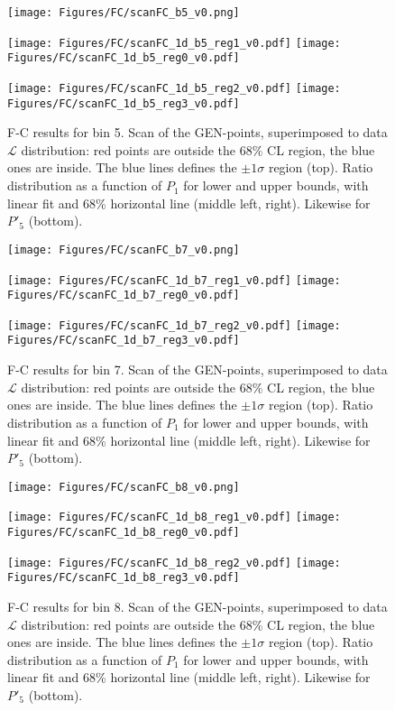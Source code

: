 \begin{figure}
  \centering
  \texttt{[image: Figures/FC/scanFC\_b5\_v0.png]}

  \texttt{[image: Figures/FC/scanFC\_1d\_b5\_reg1\_v0.pdf]}
  \texttt{[image: Figures/FC/scanFC\_1d\_b5\_reg0\_v0.pdf]}

  \texttt{[image: Figures/FC/scanFC\_1d\_b5\_reg2\_v0.pdf]}
  \texttt{[image: Figures/FC/scanFC\_1d\_b5\_reg3\_v0.pdf]}

  \caption{F-C results for bin 5.
    Scan of the GEN-points, superimposed to data $\mathcal{L}$ distribution: red points are outside the 68\% CL region, the blue ones are inside.
    The blue lines defines the $\pm1\sigma$ region (top).
    Ratio distribution as a function of $P_1$ for lower and upper bounds, with linear fit and 68\% horizontal line (middle left, right).
    Likewise for $P'_5$ (bottom).}
  \label{fig:FC5}
\end{figure}

\begin{figure}
  \centering
  \texttt{[image: Figures/FC/scanFC\_b7\_v0.png]}

  \texttt{[image: Figures/FC/scanFC\_1d\_b7\_reg1\_v0.pdf]}
  \texttt{[image: Figures/FC/scanFC\_1d\_b7\_reg0\_v0.pdf]}

  \texttt{[image: Figures/FC/scanFC\_1d\_b7\_reg2\_v0.pdf]}
  \texttt{[image: Figures/FC/scanFC\_1d\_b7\_reg3\_v0.pdf]}

  \caption{F-C results for bin 7.
    Scan of the GEN-points, superimposed to data $\mathcal{L}$ distribution: red points are outside the 68\% CL region, the blue ones are inside.
    The blue lines defines the $\pm1\sigma$ region (top).
    Ratio distribution as a function of $P_1$ for lower and upper bounds, with linear fit and 68\% horizontal line (middle left, right).
    Likewise for $P'_5$ (bottom).}
  \label{fig:FC7}
\end{figure}

\begin{figure}
  \centering
  \texttt{[image: Figures/FC/scanFC\_b8\_v0.png]}

  \texttt{[image: Figures/FC/scanFC\_1d\_b8\_reg1\_v0.pdf]}
  \texttt{[image: Figures/FC/scanFC\_1d\_b8\_reg0\_v0.pdf]}

  \texttt{[image: Figures/FC/scanFC\_1d\_b8\_reg2\_v0.pdf]}
  \texttt{[image: Figures/FC/scanFC\_1d\_b8\_reg3\_v0.pdf]}

  \caption{F-C results for bin 8.
    Scan of the GEN-points, superimposed to data $\mathcal{L}$ distribution: red points are outside the 68\% CL region, the blue ones are inside.
    The blue lines defines the $\pm1\sigma$ region (top).
    Ratio distribution as a function of $P_1$ for lower and upper bounds, with linear fit and 68\% horizontal line (middle left, right).
    Likewise for $P'_5$ (bottom).}
  \label{fig:FC8}
\end{figure}


